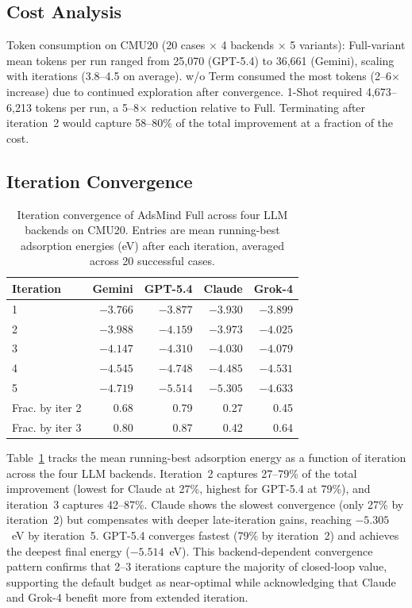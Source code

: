 \documentclass[%
 preprint,
 superscriptaddress,
 amsmath,amssymb,
 aps,
 prb,
 floatfix,
]{revtex4-2}
\begin{document}
\subsection{Cost Analysis}

Token consumption on CMU20 (20 cases $\times$ 4 backends $\times$ 5 variants): Full-variant mean tokens per run ranged from 25,070 (GPT-5.4) to 36,661 (Gemini), scaling with iterations (3.8--4.5 on average). w/o Term consumed the most tokens (2--6$\times$ increase) due to continued exploration after convergence. 1-Shot required 4,673--6,213 tokens per run, a 5--8$\times$ reduction relative to Full. Terminating after iteration~2 would capture 58--80\% of the total improvement at a fraction of the cost.

\subsection{Iteration Convergence}

\begin{table}[ht]
\centering
\caption{Iteration convergence of AdsMind Full across four LLM backends on CMU20. Entries are mean running-best adsorption energies (eV) after each iteration, averaged across 20 successful cases.}
\label{tab:si-convergence}
\begin{tabular}{lrrrr}
\toprule
Iteration & Gemini & GPT-5.4 & Claude & Grok-4 \\
\midrule
1 & $-3.766$ & $-3.877$ & $-3.930$ & $-3.899$ \\
2 & $-3.988$ & $-4.159$ & $-3.973$ & $-4.025$ \\
3 & $-4.147$ & $-4.310$ & $-4.030$ & $-4.079$ \\
4 & $-4.545$ & $-4.748$ & $-4.485$ & $-4.531$ \\
5 & $-4.719$ & $-5.514$ & $-5.305$ & $-4.633$ \\
\midrule
Frac. by iter 2 & 0.68 & 0.79 & 0.27 & 0.45 \\
Frac. by iter 3 & 0.80 & 0.87 & 0.42 & 0.64 \\
\bottomrule
\end{tabular}
\end{table}

Table~\ref{tab:si-convergence} tracks the mean running-best adsorption energy as a function of iteration across the four LLM backends. Iteration~2 captures 27--79\% of the total improvement (lowest for Claude at 27\%, highest for GPT-5.4 at 79\%), and iteration~3 captures 42--87\%. Claude shows the slowest convergence (only 27\% by iteration~2) but compensates with deeper late-iteration gains, reaching $-5.305$~eV by iteration~5. GPT-5.4 converges fastest (79\% by iteration~2) and achieves the deepest final energy ($-5.514$~eV). This backend-dependent convergence pattern confirms that 2--3 iterations capture the majority of closed-loop value, supporting the default budget as near-optimal while acknowledging that Claude and Grok-4 benefit more from extended iteration.
\end{document}
